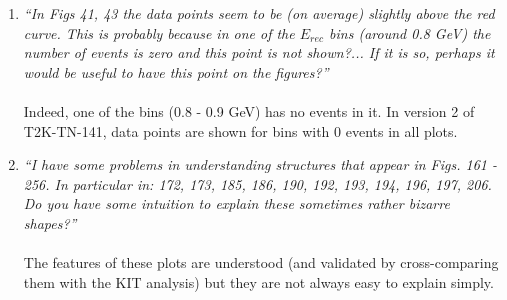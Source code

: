 \begin{enumerate}
In version 2 of T2K-TN-141, Table 11 will be modified so that, 
rather than showing the maximum oscillation parameter shifts,
it shows the maximum shift relative to the expected statistical error
computed at the point where the maximum shift occurs.

We hope that the above comments, and the revised Table to appear in version 2, clarify the issue.
In summary, the criterion for choosing the most important systematics is clear and robust,
and no exception was made to that criterion. Systematic parameter $f_{20}^{banff}$ does not meet
our selection criterion. It is clear than many variations to that selection criterion are possible.
However, the small number of parameters yielded by our choice (8 out of 48) and the fact that the 
`2+8' and `2+N' contours are nearly identical justifies our choice.

\vspace{5 mm}
\item
{\em
  ``In Figs 41, 43 the data points seem to be (on average) slightly
    above the red curve. This is probably because in one of the $E_{rec}$ bins
    (around 0.8 GeV) the number of events is zero and this point is not
    shown?... If it is so, perhaps it would be useful to have this point
    on the figures?''
}\\
\\
Indeed, one of the bins (0.8 - 0.9 GeV) has no events in it.
In version 2 of T2K-TN-141, data points are shown for bins with 0 events in all plots.

\vspace{5 mm}
\item
{\em
  ``I have some problems in understanding structures that appear in
    Figs. 161 - 256.  In particular in: 172, 173, 185, 186, 190, 192, 193,
    194, 196, 197, 206. Do you have some intuition to explain these
    sometimes rather bizarre shapes?''
}\\
\\
The features of these plots are understood (and validated by cross-comparing them with 
the KIT analysis) but they are not always easy to explain simply.


\end{enumerate}
